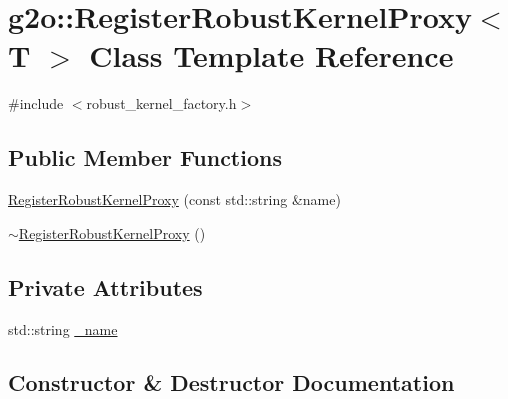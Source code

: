 \hypertarget{classg2o_1_1_register_robust_kernel_proxy}{}\section{g2o\+:\+:Register\+Robust\+Kernel\+Proxy$<$ T $>$ Class Template Reference}
\label{classg2o_1_1_register_robust_kernel_proxy}


{\ttfamily \#include $<$robust\+\_\+kernel\+\_\+factory.\+h$>$}

\subsection*{Public Member Functions}
\begin{DoxyCompactItemize}
\item 
\mbox{\hyperlink{classg2o_1_1_register_robust_kernel_proxy_a9eb5309c892d96d5cc5b3d7a15670818}{Register\+Robust\+Kernel\+Proxy}} (const std\+::string \&name)
\item 
\mbox{\hyperlink{classg2o_1_1_register_robust_kernel_proxy_a01e3078be667d1faaf2046da6c219eb7}{$\sim$\+Register\+Robust\+Kernel\+Proxy}} ()
\end{DoxyCompactItemize}
\subsection*{Private Attributes}
\begin{DoxyCompactItemize}
\item 
std\+::string \mbox{\hyperlink{classg2o_1_1_register_robust_kernel_proxy_af88f8066f09024c0a94c90d1b99bf1c4}{\+\_\+name}}
\end{DoxyCompactItemize}


\subsection{Constructor \& Destructor Documentation}
\mbox{\label{classg2o_1_1_register_robust_kernel_proxy_a9eb5309c892d96d5cc5b3d7a15670818}} 

